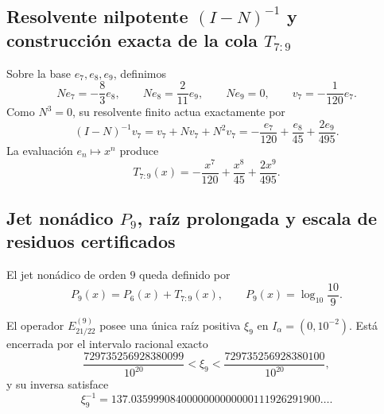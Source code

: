 \subsection{Resolvente nilpotente \texorpdfstring{\((I-N)^{-1}\)}{(I-N)^-1} y construcción exacta de la cola \texorpdfstring{\(T_{7:9}\)}{T7:9}}
\label{sec:l9s102:alpha-resolvente}

Sobre la base \(e_7,e_8,e_9\), definimos
\begin{equation}
 Ne_7=-\frac83e_8,
 \qquad
 Ne_8=\frac2{11}e_9,
 \qquad
 Ne_9=0,
 \qquad
 v_7=-\frac1{120}e_7.
 \label{eq:l9s102:alpha-nilpotente}
\end{equation}
Como \(N^3=0\), su resolvente finito actua exactamente por
\begin{equation}
 (I-N)^{-1}v_7
 =v_7+Nv_7+N^2v_7
 =-\frac{e_7}{120}+\frac{e_8}{45}+\frac{2e_9}{495}.
 \label{eq:l9s102:alpha-resolvente-finito}
\end{equation}
La evaluación \(e_n\mapsto x^n\) produce
\begin{equation}
 \boxed{
 T_{7:9}(x)=-\frac{x^7}{120}+\frac{x^8}{45}
 +\frac{2x^9}{495}.}
 \label{eq:l9s102:alpha-t79}
\end{equation}

\subsection{Jet nonádico \texorpdfstring{\(P_9\)}{P9}, raíz prolongada y escala de residuos certificados}
\label{sec:l9s102:alpha-jet-p9}

El jet nonádico de orden \(9\) queda definido por
\begin{equation}
 P_9(x)=P_6(x)+T_{7:9}(x),
 \qquad
 P_9(x)=\log_{10}\frac{10}{9}.
 \label{eq:l9s102:alpha-p9}
\end{equation}
\begin{theorem}
\label{thm:l9s102:raiz-p9-unica}
El operador \(E_{21/22}^{(9)}\) posee una única raíz positiva \(\xi_9\) en
\(I_\alpha=(0,10^{-2})\). Está encerrada por el intervalo racional exacto
\begin{equation}
 \frac{729735256928380099}{10^{20}}
 <\xi_9<
 \frac{729735256928380100}{10^{20}},
 \label{eq:l9s102:encierro-raiz-p9}
\end{equation}
y su inversa satisface
\begin{equation}
 \xi_9^{-1}
 =137.0359990840000000000000111926291900\ldots .
 \label{eq:l9s102:alpha-raíz-p9}
\end{equation}
\end{theorem}

